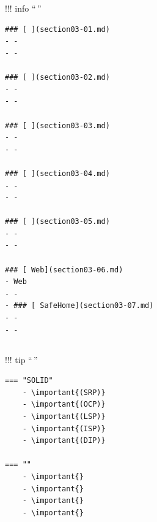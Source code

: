 \hypertarget{section}{%
\section{}\label{section}}


\hypertarget{section-1}{%
\subsection{}\label{section-1}}

\hypertarget{section-2}{%
\subsection{}\label{section-2}}

!!! info ``\,''

\begin{verbatim}
### [ ](section03-01.md)
- - 
- - 

### [ ](section03-02.md)
- - 
- - 

### [ ](section03-03.md)
- - 
- - 

### [ ](section03-04.md)
- - 
- - 

### [ ](section03-05.md)
- - 
- - 

### [ Web](section03-06.md)
- Web
- - 
- ### [ SafeHome](section03-07.md)
- - 
- - 
\end{verbatim}


\hypertarget{section-3}{%
\subsection{}\label{section-3}}

!!! tip ``\,''

\begin{verbatim}
=== "SOLID"
    - \important{(SRP)}
    - \important{(OCP)}
    - \important{(LSP)}
    - \important{(ISP)}
    - \important{(DIP)}
    
=== ""
    - \important{}
    - \important{}
    - \important{}
    - \important{}
\end{verbatim}

\hypertarget{section-4}{%
\subsection{}\label{section-4}}

